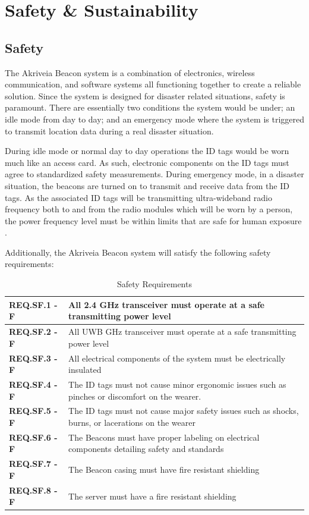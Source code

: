 

 \setcounter{section}{4}
\section{Safety \& Sustainability}
\bigskip
\subsection{Safety}
\medskip
The Akriveia Beacon system is a combination of electronics, wireless communication, and software systems all functioning together to create a reliable solution. Since the system is designed for disaster related situations, safety is paramount. There are essentially two conditions the system would be under; an idle mode from day to day; and an emergency mode where the system is triggered to transmit location data during a real disaster situation.

\bigskip
During idle mode or normal day to day operations the ID tags would be worn much like an access card. As such, electronic components on the ID tags must agree to standardized safety measurements. During emergency mode, in a disaster situation, the beacons are turned on to transmit and receive data from the ID tags. As the associated ID tags will be transmitting ultra-wideband radio frequency both to and from the radio modules which will be worn by a person, the power frequency level must be within limits that are safe for human exposure \cite{R22}.
 
\bigskip
Additionally, the Akriveia Beacon system will satisfy the following safety requirements:

\bgroup
\def\arraystretch{1.5}
\begin{table}[H]
\centering
\begin{tabular}{ | m{3cm} | m{13cm}| } 
\hline
\textbf{REQ.SF.1 - F} & All 2.4 GHz transceiver must operate at a safe transmitting power level\\
\hline
\textbf{REQ.SF.2 - F} &  All UWB GHz transceiver must operate at a safe transmitting power level\\
\hline
\textbf{REQ.SF.3 - F} & All electrical components of the system must be electrically insulated \\
\hline
\textbf{REQ.SF.4 - F} & The ID tags must not cause minor ergonomic issues such as pinches or discomfort on the wearer.\\
\hline
\textbf{REQ.SF.5 - F} & The ID tags must not cause major safety issues such as shocks, burns, or lacerations on the wearer\\
\hline
\textbf{REQ.SF.6 - F} & The Beacons must have proper labeling on electrical components detailing safety and standards \\
\hline
\textbf{REQ.SF.7 - F} & The Beacon casing must have fire resistant shielding \\
\hline
\textbf{REQ.SF.8 - F} & The server must have a fire resistant shielding \\
\hline
\end{tabular}
\caption{Safety Requirements}
\end{table}	

